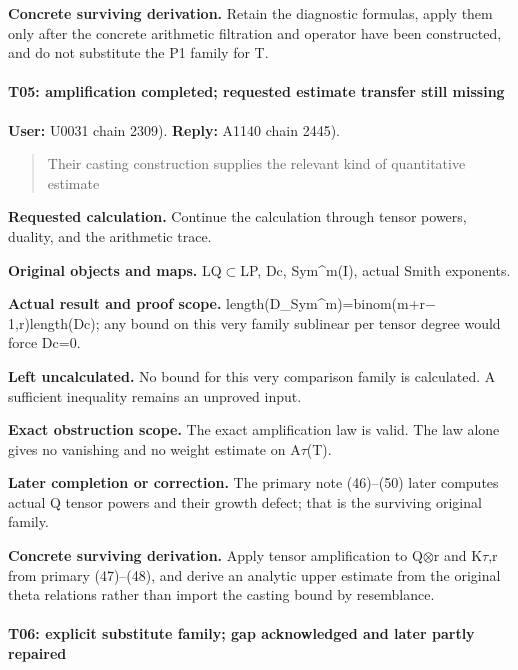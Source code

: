 \textbf{Concrete surviving derivation.} Retain the diagnostic formulas,
apply them only after the concrete arithmetic filtration and operator
have been constructed, and do not substitute the P1 family for T.

\paragraph{T05: amplification completed; requested estimate transfer
still
missing}\label{t05-amplification-completed-requested-estimate-transfer-still-missing}

\textbf{User:} U0031
\protect{} chain 2309).
\textbf{Reply:} A1140
\protect{} chain 2445).

\begin{quote}
Their casting construction supplies the relevant kind of quantitative
estimate
\end{quote}

\textbf{Requested calculation.} Continue the calculation through tensor
powers, duality, and the arithmetic trace.

\textbf{Original objects and maps.}
LQ\allowbreak{}\ensuremath{⊂}\allowbreak{}LP, Dc, Sym\^{}m(I), actual
Smith exponents.

\textbf{Actual result and proof scope.}
length(D\_Sym\textasciicircum{}m)=binom(m+r\allowbreak{}\ensuremath{−}\allowbreak{}1,r)length(Dc);
any bound on this very family sublinear per tensor degree would force
Dc=0.

\textbf{Left uncalculated.} No bound for this very comparison family is
calculated. A sufficient inequality remains an unproved input.

\textbf{Exact obstruction scope.} The exact amplification law is valid.
The law alone gives no vanishing and no weight estimate on
A\allowbreak{}\ensuremath{τ}\allowbreak{}(T).

\textbf{Later completion or correction.} The primary note (46)--(50)
later computes actual Q tensor powers and their growth defect; that is
the surviving original family.

\textbf{Concrete surviving derivation.} Apply tensor amplification to
Q\allowbreak{}\ensuremath{⊗}\allowbreak{}r and
K\allowbreak{}\ensuremath{τ}\allowbreak{},r from primary (47)--(48), and
derive an analytic upper estimate from the original theta relations
rather than import the casting bound by resemblance.

\paragraph{T06: explicit substitute family; gap acknowledged and later
partly
repaired}\label{t06-explicit-substitute-family-gap-acknowledged-and-later-partly-repaired}

